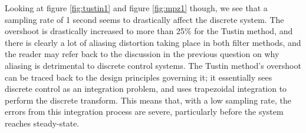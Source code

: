 \documentclass[a4paper, 12pt]{article}
\begin{document}
Looking at figure \ref{fig:tustin1} and figure \ref{fig:mpz1} though, we see
that a sampling rate of 1 second seems to drastically affect the discrete
system. The overshoot is drastically increased to more than 25\% for the Tustin
method, and there is clearly a lot of aliasing distortion taking place in both
filter methods, and the reader may refer back to the discussion in the previous
question on why aliasing is detrimental to discrete control systems. The Tustin
method's overshoot can be traced back to the design principles governing it; it
essentially sees discrete control as an integration problem, and uses
trapezoidal integration to perform the discrete transform. This means that,
with a low sampling rate, the errors from this integration process are severe,
particularly before the system reaches steady-state.
\end{document}
